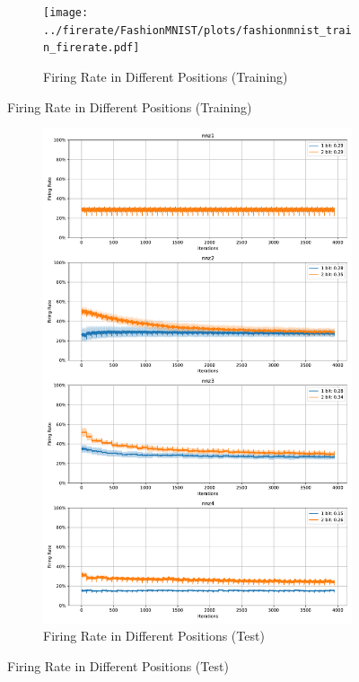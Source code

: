         \begin{figure}[H]
            \centering
            \begin{subfigure}[H]{0.8\textwidth}
                \centering
                \texttt{[image: ../firerate/FashionMNIST/plots/fashionmnist\_train\_firerate.pdf]}
                \caption{Firing Rate in Different Positions (Training)}
            \end{subfigure}
        \end{figure}
        \begin{figure}[H]
            \centering
            \ContinuedFloat
            \begin{subfigure}[H]{0.8\textwidth}
                \centering
                \includegraphics[width=\textwidth]{../firerate/FashionMNIST/plots/fashionmnist_test_firerate.pdf}
                \caption{Firing Rate in Different Positions (Test)}
            \end{subfigure}
        \end{figure}
